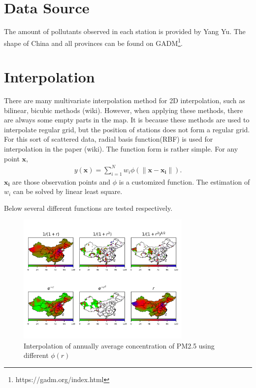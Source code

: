 \documentclass[letterpaper]{article}
\begin{document}
%
\title{}
\author{}
\maketitle
\begin{abstract}
\begin{quote}
\end{quote}
\end{abstract}

\section{Data Source}

The amount of pollutants observed in each station is provided by Yang Yu. The shape of China and all provinces can be found on GADM\footnote{https://gadm.org/index.html}. 

\section{Interpolation}

There are many multivariate interpolation method for 2D interpolation, such as bilinear, bicubic methods (wiki). However, when applying these methods, there are always some empty parts in the map. It is because these methods are used to interpolate regular grid, but the position of stations does not form a regular grid. For this sort of scattered data, radial basis function(RBF) is used for interpolation in the paper (wiki). The function form is rather simple. For any point $\mathbf{x}$, 
\begin{eqnarray}
  y(\mathbf{x}) = \sum_{i=1}^Nw_i\phi\left(\|\mathbf{x} - \mathbf{x_i}\|\right). 
\end{eqnarray}
$\mathbf{x_i}$ are those observation points and $\phi$ is a customized function. The estimation of $w_i$ can be solved by linear least square.

Below several different functions are tested respectively. 
\begin{figure}[h]
  \includegraphics[width = 8.5cm]{Interpolation_from_20150102_to_20151231.png}
  \caption{Interpolation of annually average concentration of PM2.5 using different
    $\phi(r)$}
  \label{figure:0}
  \centering
\end{figure}
\end{document}

